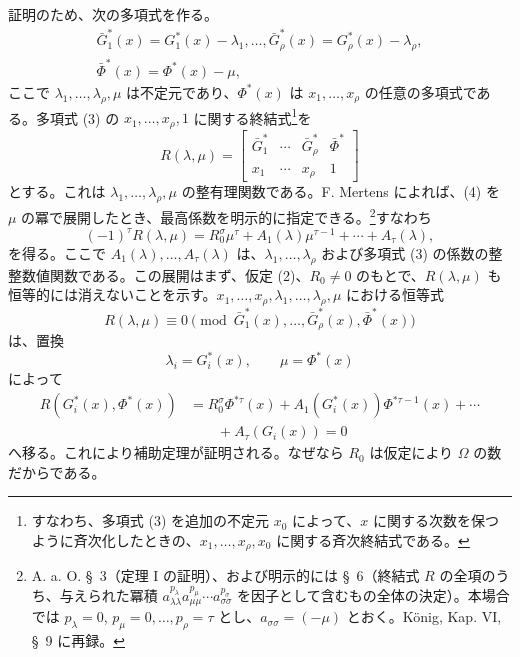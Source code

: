 \documentclass[11pt]{jlreq}
\begin{document}
証明のため、次の多項式を作る。
\begin{equation}
\begin{gathered}
  \bar G_1^*(x)=G_1^*(x)-\lambda_1,
  \ldots,
  \bar G_\rho^*(x)=G_\rho^*(x)-\lambda_\rho,\\
  \bar\Phi^*(x)=\Phi^*(x)-\mu,
\end{gathered}
\tag{3}
\end{equation}
ここで $\lambda_1,\ldots,\lambda_\rho,\mu$ は不定元であり、$\Phi^*(x)$ は $x_1,\ldots,x_\rho$ の任意の多項式である。多項式 (3) の $x_1,\ldots,x_\rho,1$ に関する終結式\footnote{すなわち、多項式 (3) を追加の不定元 $x_0$ によって、$x$ に関する次数を保つように斉次化したときの、$x_1,\ldots,x_\rho,x_0$ に関する斉次終結式である。}を
\begin{equation}
  R(\lambda,\mu)=\left[
  \begin{array}{cccc}
   \bar G_1^*&\cdots&\bar G_\rho^*&\bar\Phi^*\\
   x_1&\cdots&x_\rho&1
  \end{array}
  \right]
\tag{4}
\end{equation}
とする。これは $\lambda_1,\ldots,\lambda_\rho,\mu$ の整有理関数である。F. Mertens によれば、(4) を $\mu$ の冪で展開したとき、最高係数を明示的に指定できる。\footnote{A. a. O. \S\ 3（定理 I の証明）、および明示的には \S\ 6（終結式 $R$ の全項のうち、与えられた冪積 $a_{\lambda\lambda}^{p_\lambda}a_{\mu\mu}^{p_\mu}\cdots a_{\sigma\sigma}^{p_\sigma}$ を因子として含むもの全体の決定）。本場合では $p_\lambda=0$, $p_\mu=0,\ldots,p_\rho=\tau$ とし、$a_{\sigma\sigma}=(-\mu)$ とおく。König, Kap. VI, \S\ 9 に再録。}すなわち
\begin{equation}
  (-1)^\tau R(\lambda,\mu)
  =R_0^\sigma\mu^\tau+A_1(\lambda)\mu^{\tau-1}+\cdots+A_\tau(\lambda),
\tag{5}
\end{equation}
を得る。ここで $A_1(\lambda),\ldots,A_\tau(\lambda)$ は、$\lambda_1,\ldots,\lambda_\rho$ および多項式 (3) の係数の整整数値関数である。この展開はまず、仮定 (2)、$R_0\ne0$ のもとで、$R(\lambda,\mu)$ も恒等的には消えないことを示す。$x_1,\ldots,x_\rho,\lambda_1,\ldots,\lambda_\rho,\mu$ における恒等式
\[
  R(\lambda,
\mu)\equiv 0\pmod{\bar G_1^*(x),\ldots,
\bar G_\rho^*(x),\bar\Phi^*(x)}
\]
は、置換
\[
  \lambda_i=G_i^*(x),\qquad \mu=\Phi^*(x)
\]
によって
\begin{equation}
\begin{aligned}
  R(G_i^*(x),\Phi^*(x))
  &=R_0^\sigma\Phi^{*\tau}(x)
    +A_1(G_i^*(x))\Phi^{*\tau-1}(x)+\cdots \\
  &\qquad +A_\tau(G_i(x))=0
\end{aligned}
\tag{6}
\end{equation}
へ移る。これにより補助定理が証明される。なぜなら $R_0$ は仮定により $\Omega$ の数だからである。
\end{document}
